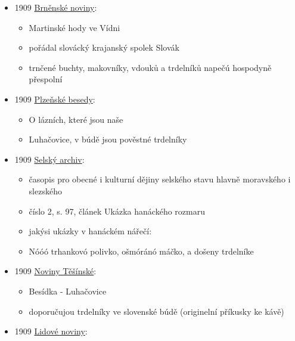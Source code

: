 \begin{itemize}
  \begin{itemize}
  \tightlist
  \item
    Herzer, Jan
  \item
    náčepka = Prügelkrapfen
  \end{itemize}
\item
  1909
  \href{https://ceskadigitalniknihovna.cz/uuid/uuid:c455e0f0-cd7f-11e3-b110-005056827e51}{Brněnské
  noviny}:

  \begin{itemize}
  \tightlist
  \item
    Martinské hody ve Vídni
  \item
    pořádal slovácký krajanský spolek Slovák
  \item
    trnčené buchty, makovníky, vdouků a trdelníků napečú hospodyně
    přespolní
  \end{itemize}
\item
  1909
  \href{https://ceskadigitalniknihovna.cz/uuid/uuid:649fe960-411f-47df-9f66-f407e20f9b16}{Plzeňské
  besedy}:

  \begin{itemize}
  \tightlist
  \item
    O lázních, které jsou naše
  \item
    Luhačovice, v búdě jsou pověstné trdelníky
  \end{itemize}
\item
  1909
  \href{https://www.digitalniknihovna.cz/svkos/uuid/uuid:c2502d70-1a5d-11e0-8bcf-0013d398622b}{Selský
  archiv}:

  \begin{itemize}
  \tightlist
  \item
    časopis pro obecné i kulturní dějiny selského stavu hlavně
    moravského i slezského
  \item
    číslo 2, s. 97, článek Ukázka hanáckého rozmaru
  \item
    jakýsi ukázky v hanáckém nářečí:
  \item
    Nóóó trhankovó polivko, ošmóránó máčko, a došeny trdelníke
  \end{itemize}
\item
  1909
  \href{https://www.digitalniknihovna.cz/svkos/uuid/uuid:9496e900-7784-11de-9965-0013d398622b}{Noviny
  Těšínské}:

  \begin{itemize}
  \tightlist
  \item
    Besídka - Luhačovice
  \item
    doporučujou trdelníky ve slovenské búdě (originelní příkusky ke
    kávě)
  \end{itemize}
\item
  1909
  \href{https://www.digitalniknihovna.cz/vkol/uuid/uuid:c0ebefc6-435d-11dd-b505-00145e5790ea}{Lidové
  noviny}:


\end{itemize}
